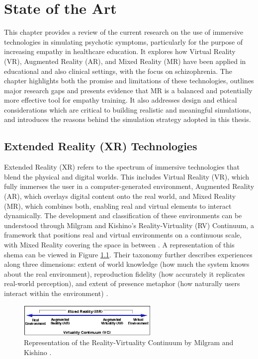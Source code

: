 \chapter{State of the Art}
\label{ch:background}

This chapter provides a review of the current research on the use of immersive technologies in simulating psychotic symptoms, particularly for the purpose of increasing empathy in healthcare education. It explores how Virtual Reality (VR), Augmented Reality (AR), and Mixed Reality (MR) have been applied in educational and also clinical settings, with the focus on schizophrenia. The chapter highlights both the promise and limitations of these technologies, outlines major research gaps and presents evidence that MR is a balanced and potentially more effective tool for empathy training. It also addresses design and ethical considerations which are critical to building realistic and meaningful simulations, and introduces the reasons behind the simulation strategy adopted in this thesis.

\section{Extended Reality (XR) Technologies}
Extended Reality (XR) refers to the spectrum of immersive technologies that blend the physical and digital worlds. This includes Virtual Reality (VR), which fully immerses the user in a computer-generated environment, Augmented Reality (AR), which overlays digital content onto the real world, and Mixed Reality (MR), which combines both, enabling real and virtual elements to interact dynamically. The development and classification of these environments can be understood through Milgram and Kishino’s Reality-Virtuality (RV) Continuum, a framework that positions real and virtual environments on a continuous scale, with Mixed Reality covering the space in between \cite{milgram1994}. A representation of this shema can be viewed in Figure \ref{fig:milgram}. Their taxonomy further describes experiences along three dimensions: extent of world knowledge (how much the system knows about the real environment), reproduction fidelity (how accurately it replicates real-world perception), and extent of presence metaphor (how naturally users interact within the environment) \cite{Skarbez2021}. 

\vspace{1em}

\begin{figure}[h!] 
    \centering 
    \includegraphics[width=0.6\textwidth]{../../Figures/milgram.jpeg} 
    \caption{Representation of the Reality-Virtuality Continuum by Milgram and Kishino \cite{milgram1994}.} 
    \label{fig:milgram} 
\end{figure}

